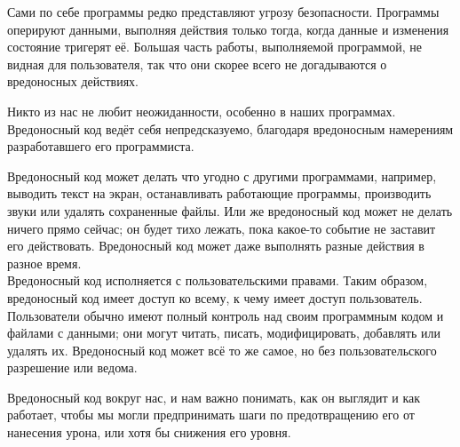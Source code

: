 Сами по себе программы редко представляют угрозу безопасности. Программы оперируют данными, выполняя действия только тогда, когда данные и изменения состояние тригерят её. Большая часть работы, выполняемой программой, не видная для пользователя, так что они скорее всего не догадываются о вредоносных действиях. \\


Никто из нас не любит неожиданности, особенно в наших программах. Вредоносный код ведёт себя непредсказуемо, благодаря вредоносным намерениям разработавшего его программиста. \\


Вредоносный код может делать что угодно с другими программами, например, выводить текст на экран, останавливать работающие программы, производить звуки или удалять сохраненные файлы. Или же вредоносный код может не делать ничего прямо сейчас; он будет тихо лежать, пока какое-то событие не заставит его действовать. Вредоносный код может даже выполнять разные действия в разное время. \\

Вредоносный код исполняется с пользовательскими правами. Таким образом, вредоносный код имеет доступ ко всему, к чему имеет доступ пользователь. Пользователи обычно имеют полный контроль над своим программным кодом и файлами с данными; они могут читать, писать, модифицировать, добавлять или удалять их. Вредоносный код может всё то же самое, но без пользовательского разрешение или ведома. \\


Вредоносный код вокруг нас, и нам важно понимать, как он выглядит и как работает, чтобы мы могли предпринимать шаги по предотвращению его от нанесения урона, или хотя бы снижения его уровня. 




